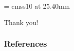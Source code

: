 \documentclass[xcolor=dvipsnames]{beamer}
\begin{document}
\appendix
{}
\setcounter{finalframe}{\value{framenumber}}

\begin{frame}

      \begin{center}

        \font\endfont = cmss10 at 25.40mm
        \color{MUgold}
        \endfont 
        \baselineskip 20.0mm

        Thank you!

      \end{center}    


\end{frame}

\begin{frame}[allowframebreaks]
        \frametitle{References}
        
        
\end{frame} 
\setcounter{framenumber}{\value{finalframe}}
\end{document}
